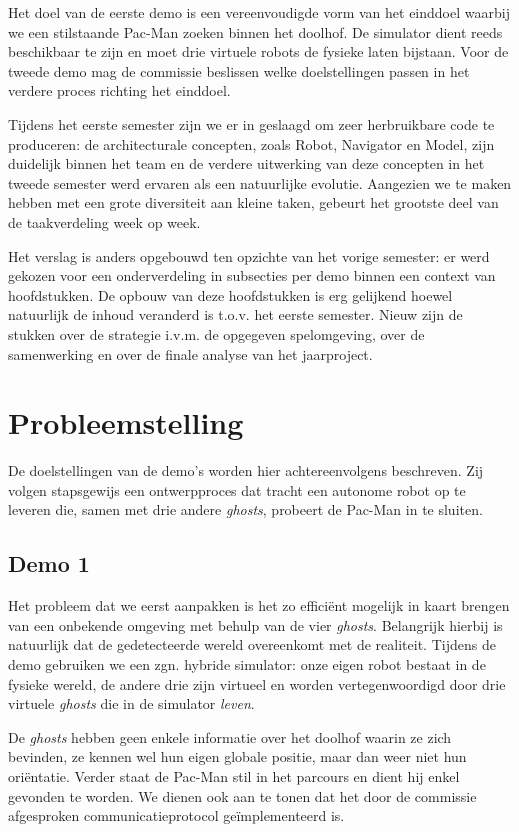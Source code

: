 \documentclass[12pt,a4paper]{report}
\begin{document}
Het doel van de eerste demo is een vereenvoudigde vorm van het einddoel waarbij we een stilstaande Pac-Man zoeken binnen het doolhof. De simulator dient  reeds beschikbaar te zijn en moet drie virtuele robots de fysieke laten bijstaan. Voor de tweede demo mag de commissie beslissen welke doelstellingen passen in het verdere proces richting het einddoel.

Tijdens het eerste semester zijn we er in geslaagd om zeer herbruikbare code te produceren: de architecturale concepten, zoals Robot, Navigator en Model, zijn duidelijk binnen het team en de verdere uitwerking van deze concepten in het tweede semester werd ervaren als een natuurlijke evolutie. Aangezien we te maken hebben met een grote diversiteit aan kleine taken, gebeurt het grootste deel van de taakverdeling week op week.

Het verslag is anders opgebouwd ten opzichte van het vorige semester: er werd gekozen voor een onderverdeling in subsecties per demo binnen een context van hoofdstukken. De opbouw van deze hoofdstukken is erg gelijkend hoewel natuurlijk de inhoud veranderd is t.o.v. het eerste semester. Nieuw zijn de stukken over de strategie i.v.m. de opgegeven spelomgeving, over de samenwerking en over de finale analyse van het jaarproject.

\chapter{Probleemstelling}

De doelstellingen van de demo's worden hier achtereenvolgens beschreven. Zij volgen stapsgewijs een ontwerpproces dat tracht een autonome robot op te leveren die, samen met drie andere \emph{ghosts}, probeert de Pac-Man in te sluiten.

\section{Demo 1}

Het probleem dat we eerst aanpakken is het zo effici\"ent mogelijk in kaart brengen van een onbekende omgeving met behulp van de vier \emph{ghosts}. Belangrijk hierbij is natuurlijk dat de gedetecteerde wereld overeenkomt met de realiteit. Tijdens de demo gebruiken we een zgn. hybride simulator: onze eigen robot bestaat in de fysieke wereld, de andere drie zijn virtueel en worden vertegenwoordigd door drie virtuele \emph{ghosts} die in de simulator \emph{leven}.

De \emph{ghosts} hebben geen enkele informatie over het doolhof waarin ze zich bevinden, ze kennen wel hun eigen globale positie, maar dan weer niet hun ori\"entatie. Verder staat de Pac-Man stil in het parcours en dient hij enkel gevonden te worden. We dienen ook aan te tonen dat het door de commissie afgesproken communicatieprotocol ge\"implementeerd is.
\end{document}
